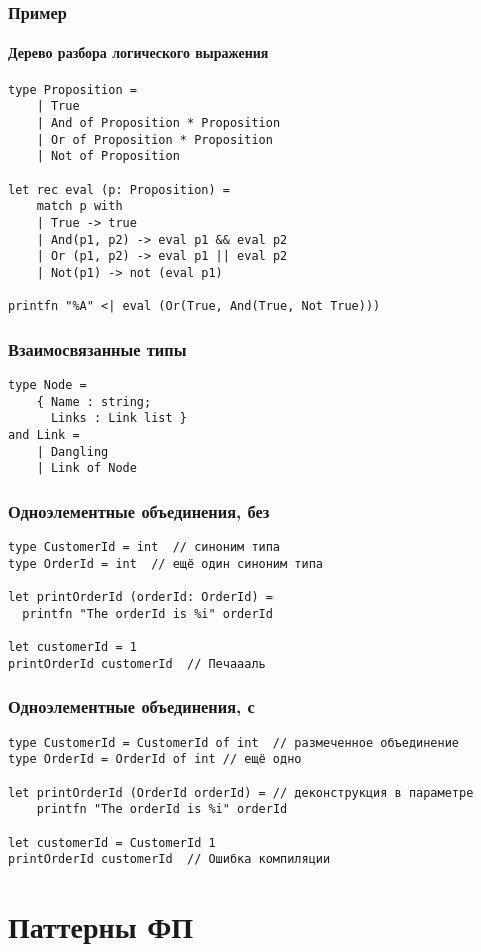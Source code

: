 \documentclass[xetex,mathserif,serif]{beamer}
\begin{document}
	\begin{frame}[fragile]
		\frametitle{Пример}
		\framesubtitle{Дерево разбора логического выражения}
		\begin{verbatim}
type Proposition =
    | True
    | And of Proposition * Proposition
    | Or of Proposition * Proposition
    | Not of Proposition

let rec eval (p: Proposition) =
    match p with
    | True -> true
    | And(p1, p2) -> eval p1 && eval p2
    | Or (p1, p2) -> eval p1 || eval p2
    | Not(p1) -> not (eval p1)

printfn "%A" <| eval (Or(True, And(True, Not True)))
		\end{verbatim}
	\end{frame}

	\begin{frame}[fragile]
		\frametitle{Взаимосвязанные типы}
		\begin{verbatim}
type Node =
    { Name : string;
      Links : Link list }
and Link =
    | Dangling
    | Link of Node
		\end{verbatim}
	\end{frame}

	\begin{frame}[fragile]
		\frametitle{Одноэлементные объединения, без}
		\begin{verbatim}
type CustomerId = int  // синоним типа
type OrderId = int  // ещё один синоним типа

let printOrderId (orderId: OrderId) =
  printfn "The orderId is %i" orderId

let customerId = 1  
printOrderId customerId  // Печаааль
		\end{verbatim}
	\end{frame}

	\begin{frame}[fragile]
		\frametitle{Одноэлементные объединения, с}
		\begin{verbatim}
type CustomerId = CustomerId of int  // размеченное объединение 
type OrderId = OrderId of int // ещё одно

let printOrderId (OrderId orderId) = // деконструкция в параметре
    printfn "The orderId is %i" orderId

let customerId = CustomerId 1
printOrderId customerId  // Ошибка компиляции
		\end{verbatim}
	\end{frame}

	\section{Паттерны ФП}
\end{document}

